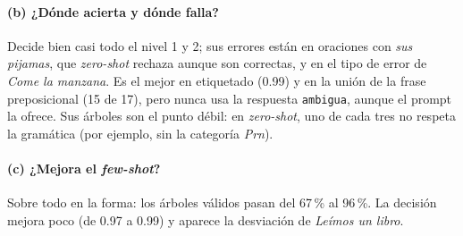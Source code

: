 \paragraph{(b) ¿Dónde acierta y dónde falla?} Decide bien casi todo el nivel 1 y 2; sus errores
están en oraciones con \emph{sus pijamas}, que \emph{zero-shot} rechaza aunque son correctas, y
en el tipo de error de \emph{Come la manzana}. Es el mejor en etiquetado (0.99) y en la unión de
la frase preposicional (15 de 17), pero nunca usa la respuesta \texttt{ambigua}, aunque el prompt
la ofrece. Sus árboles son el punto débil: en \emph{zero-shot}, uno de cada tres no respeta la
gramática (por ejemplo,  sin la categoría \textit{Prn}).

\paragraph{(c) ¿Mejora el \emph{few-shot}?} Sobre todo en la forma: los árboles válidos pasan del
67\,\% al 96\,\%. La decisión mejora poco (de 0.97 a 0.99) y aparece la desviación de
\emph{Leímos un libro}.
